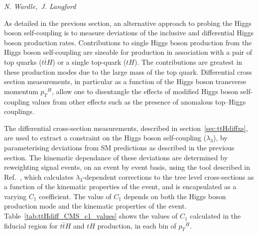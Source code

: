 \newcommand{\ttH}{\ensuremath{t\bar{t}H}}
\newcommand{\pt}{\ensuremath{p_{T}}}
\newcommand{\ptH}{\ensuremath{\pt^{H}}}

\newcommand{\tH}{\ensuremath{tH}}
\newcommand{\tHW}{\ensuremath{tHW}}
\newcommand{\tHQ}{\ensuremath{tHq}}
\newcommand{\VH}{\ensuremath{VH}}
\newcommand{\ggH}{\ensuremath{gg\rightarrow H}}
\newcommand{\mgg}{\ensuremath{m_{\gamma\gamma}}}
\newcommand{\ptgg}{\ensuremath{\pt^{\gamma\gamma}}}

\newcommand{\hgg}{\ensuremath{H\rightarrow\gamma\gamma}}


\begin{center}
\textit{N. Wardle,~J. Langford}
\end{center}


As detailed in the previous section, an alternative approach to probing the Higgs boson self-coupling is to measure deviations of the inclusive and differential Higgs boson production rates. Contributions to single Higgs boson production from the Higgs boson self-coupling are sizeable for production in association with a pair of top quarks ($\ttH$) or a single top-quark ($\tH$). The contributions are  greatest in these production modes due to the large mass of the top quark. Differential cross section measurements, in particular as a function of the Higgs boson 
transverse momentum $\pt^{H}$, allow one to disentangle the effects of modified Higgs boson self-coupling values from 
other effects such as the presence of anomalous top--Higgs couplings.  



The differential cross-section measurements, described in section~\ref{sec:ttHdiffxs}, 
are used to extract a 
constraint on the Higgs boson self-coupling ($\lambda_{3}$), by parameterising deviations from SM predictions as described in the previous section. The kinematic dependance of these deviations are determined by reweighting signal events, on an event by event basis, using the tool described in Ref.~\cite{EWreweightingtool}, which calculates $\lambda_3$-dependent corrections to the tree level cross-sections as a function of the kinematic properties of the event, and is encapsulated as a 
varying $C_{1}$ coefficient. The value of $C_{1}$ depends on both the Higgs boson production mode and the kinematic properties of the event. Table~\ref{tab:ttHdiff_CMS_c1_values} shows the values of $C_1$ calculated in the fiducial region for $\ttH$ and $\tH$ production, in each bin of $\ptH$.

